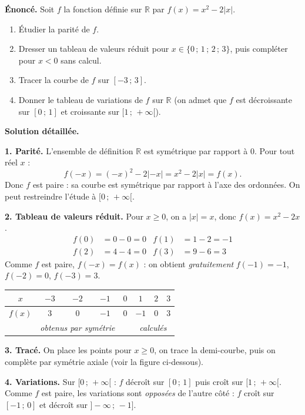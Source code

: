 \documentclass[11pt]{article}
\newcommand{\cle}[1]{{\popxbold\color{popdark}#1}}
\begin{document}
\begin{exoresolu}[Étude complète de $f(x) = x^2 - 2|x|$]
\textbf{Énoncé.} Soit $f$ la fonction définie sur $\mathbb{R}$ par $f(x) = x^2 - 2|x|$.
\begin{enumerate}
\item Étudier la parité de $f$.
\item Dresser un tableau de valeurs réduit pour $x \in \{0\,;\,1\,;\,2\,;\,3\}$, puis compléter pour $x < 0$ sans calcul.
\item Tracer la courbe de $f$ sur $[-3\,;\,3]$.
\item Donner le tableau de variations de $f$ sur $\mathbb{R}$ (on admet que $f$ est décroissante sur $[0\,;\,1]$ et croissante sur $[1\,;\,+\infty[$).
\end{enumerate}
\tcblower
\textbf{Solution détaillée.}

\textbf{1. Parité.} L'ensemble de définition $\mathbb{R}$ est symétrique par rapport à $0$. Pour tout réel $x$ :
\[ f(-x) = (-x)^2 - 2|-x| = x^2 - 2|x| = f(x). \]
Donc $f$ est \cle{paire} : sa courbe est symétrique par rapport à l'axe des ordonnées. On peut restreindre l'étude à $[0\,;\,+\infty[$.

\textbf{2. Tableau de valeurs réduit.} Pour $x \geq 0$, on a $|x| = x$, donc $f(x) = x^2 - 2x$.
\begin{align*}
f(0) &= 0 - 0 = 0 & f(1) &= 1 - 2 = -1\\
f(2) &= 4 - 4 = 0 & f(3) &= 9 - 6 = 3
\end{align*}
Comme $f$ est paire, $f(-x) = f(x)$ : on obtient \emph{gratuitement} $f(-1) = -1$, $f(-2) = 0$, $f(-3) = 3$.

\begin{center}
\begin{tabular}{|c|ccccccc|}
\hline
$x$ & $-3$ & $-2$ & $-1$ & $0$ & $1$ & $2$ & $3$ \\
\hline
$f(x)$ & $3$ & $0$ & $-1$ & $0$ & $-1$ & $0$ & $3$ \\
\hline
 & \multicolumn{3}{c|}{\textit{obtenus par symétrie}} & & \multicolumn{3}{c|}{\textit{calculés}} \\
\hline
\end{tabular}
\end{center}

\textbf{3. Tracé.} On place les points pour $x \geq 0$, on trace la demi-courbe, puis on complète par symétrie axiale (voir la figure ci-dessous).

\textbf{4. Variations.} Sur $[0\,;\,+\infty[$ : $f$ décroît sur $[0\,;\,1]$ puis croît sur $[1\,;\,+\infty[$. Comme $f$ est paire, les variations sont \emph{opposées} de l'autre côté : $f$ croît sur $[-1\,;\,0]$ et décroît sur $]-\infty\,;\,-1]$.


\end{exoresolu}
\end{document}
